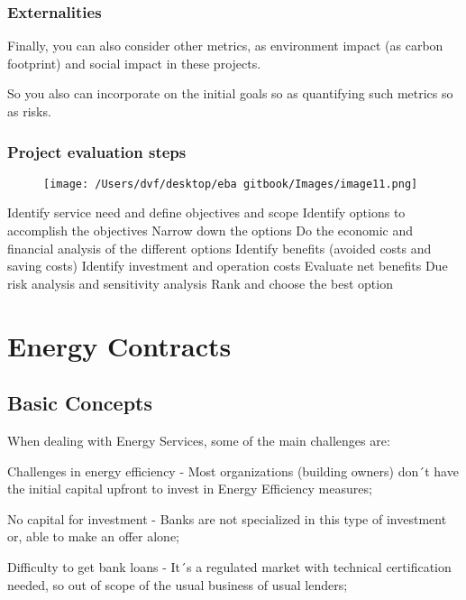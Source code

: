 \documentclass[]{book}
\theoremstyle{definition}
\theoremstyle{definition}
\theoremstyle{definition}
\theoremstyle{remark}
\begin{document}
\subsection{Externalities}\label{externalities}

Finally, you can also consider other metrics, as environment impact (as
carbon footprint) and social impact in these projects.

So you also can incorporate on the initial goals so as quantifying such
metrics so as risks.

\subsection{Project evaluation steps}\label{project-evaluation-steps}

\begin{figure}[htbp]
\centering
\texttt{[image: /Users/dvf/desktop/eba gitbook/Images/image11.png]}
\caption{}
\end{figure}

Identify service need and define objectives and scope Identify options
to accomplish the objectives Narrow down the options Do the economic and
financial analysis of the different options Identify benefits (avoided
costs and saving costs) Identify investment and operation costs Evaluate
net benefits Due risk analysis and sensitivity analysis Rank and choose
the best option

\chapter{Energy Contracts}\label{energy-contracts}

\section{Basic Concepts}\label{basic-concepts-1}

When dealing with Energy Services, some of the main challenges are:

Challenges in energy efficiency - Most organizations (building owners)
don´t have the initial capital upfront to invest in Energy Efficiency
measures;

No capital for investment - Banks are not specialized in this type of
investment or, able to make an offer alone;

Difficulty to get bank loans - It´s a regulated market with technical
certification needed, so out of scope of the usual business of usual
lenders;
\end{document}
